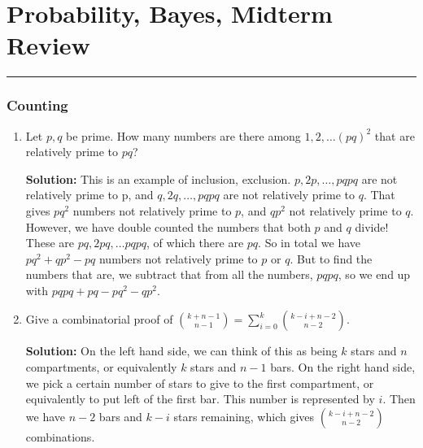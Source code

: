 \documentclass{article}
\newenvironment{solution}{

            \color{blue} \smallskip \textbf{Solution:}}{}
\begin{document}
    
    \part*{Probability, Bayes, Midterm Review}
    \vspace{-7pt}
    \hrule
    \vspace{7pt}
    \section{Counting}
    \begin{enumerate}
        \item Let $p, q$ be prime. How many numbers are there among $1, 2, \ldots (pq)^2$ that are relatively prime to $pq$?
        \begin{solution}
        This is an example of inclusion, exclusion. $p, 2p, \ldots, pqpq$ are not relatively prime to p, and $q, 2q, \ldots, pqpq$ are not relatively
        prime to $q$. That gives $pq^2$ numbers not relatively prime to $p$, and $qp^2$ not relatively prime to $q$. However, we have double counted the
        numbers that both $p$ and $q$ divide! These are $pq, 2pq, \ldots pqpq$, of which there are $pq$. So in total we have $pq^2 + qp^2 - pq$ numbers not
        relatively prime to $p$ or $q$. But to find the numbers that are, we subtract that from all the numbers, $pqpq$, so we end up with
        $pqpq + pq - pq^2 - qp^2$.
        \end{solution}
    
        \item Give a combinatorial proof of ${k+n - 1 \choose n-1} = \sum_{i=0}^k {k-i+n-2 \choose n-2}$.
        \begin{solution}
        On the left hand side, we can think of this as being $k$ stars and $n$ compartments, or equivalently $k$ stars and $n-1$ bars.
        On the right hand side, we pick a certain number of stars to give to the first compartment, or equivalently to put left of the first bar. This number
        is represented by $i$. Then we have $n-2$ bars and $k-i$ stars remaining, which gives ${k-i+n-2 \choose n-2}$ combinations.
        \end{solution}
    \end{enumerate}
\end{document}
